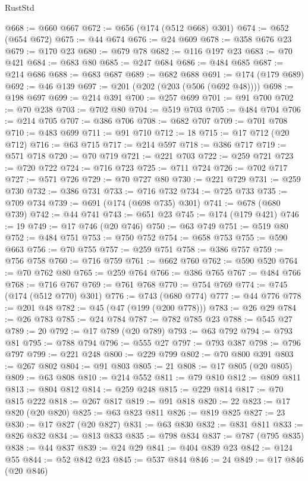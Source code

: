 \begin{lexlean}{RustStd}
\begin{coremodule}
@668 := @660 @667
@672 := @656 (@174 (@512 @668) @301)
@674 := @652 (@654 @672)
@675 := @44 @674
@676 := @24 @609
@678 := @358 @676 @23
@679 := @170 @23
@680 := @679 @78
@682 := @116 @197 @23
@683 := @70 @421
@684 := @683 @80
@685 := @247 @684
@686 := @484 @685
@687 := @214 @686
@688 := @683 @687
@689 := @682 @688
@691 := @174 (@179 @689)
@692 := @46 @139
@697 := @201 (@202 (@203 (@506 (@692 @48))))
@698 := @198 @697
@699 := @214 @391
@700 := @257 @699
@701 := @91 @700
@702 := @70 @238
@703 := @702 @80
@704 := @519 @703
@705 := @484 @704
@706 := @214 @705
@707 := @386 @706
@708 := @682 @707
@709 := @701 @708
@710 := @483 @699
@711 := @91 @710
@712 := 18
@715 := @17 @712 (@20 @712)
@716 := @63 @715
@717 := @214 @597
@718 := @386 @717
@719 := @571 @718
@720 := @70 @719
@721 := @221 @703
@722 := @259 @721
@723 := @720 @722
@724 := @716 @723
@725 := @711 @724
@726 := @702 @717
@727 := @571 @726
@729 := @70 @727 @80
@730 := @221 @729
@731 := @259 @730
@732 := @386 @731
@733 := @716 @732
@734 := @725 @733
@735 := @709 @734
@739 := @691 (@174 (@698 @735) @301)
@741 := @678 (@680 @739)
@742 := @44 @741
@743 := @651 @23
@745 := @174 (@179 @421)
@746 := 19
@749 := @17 @746 (@20 @746)
@750 := @63 @749
@751 := @519 @80
@752 := @484 @751
@753 := @750 @752
@754 := @658 @753
@755 := @590 @663
@756 := @70 @755
@757 := @259 @751
@758 := @386 @757
@759 := @756 @758
@760 := @716 @759
@761 := @662 @760
@762 := @590 @520
@764 := @70 @762 @80
@765 := @259 @764
@766 := @386 @765
@767 := @484 @766
@768 := @716 @767
@769 := @761 @768
@770 := @754 @769
@774 := @745 (@174 (@512 @770) @301)
@776 := @743 (@680 @774)
@777 := @44 @776
@778 := @201 @48
@782 := @45 (@47 (@199 (@200 @778)))
@783 := @26 @29
@784 := @26 @783
@785 := @24 @784
@787 := @782 @785 @23
@788 := @545 @27
@789 := 20
@792 := @17 @789 (@20 @789)
@793 := @63 @792
@794 := @793 @81
@795 := @788 @794
@796 := @555 @27
@797 := @793 @387
@798 := @796 @797
@799 := @221 @248
@800 := @229 @799
@802 := @70 @800 @391
@803 := @267 @802
@804 := @91 @803
@805 := 21
@808 := @17 @805 (@20 @805)
@809 := @63 @808
@810 := @214 @552
@811 := @79 @810
@812 := @809 @811
@813 := @804 @812
@814 := @259 @248
@815 := @229 @814
@817 := @70 @815 @222
@818 := @267 @817
@819 := @91 @818
@820 := 22
@823 := @17 @820 (@20 @820)
@825 := @63 @823 @811
@826 := @819 @825
@827 := 23
@830 := @17 @827 (@20 @827)
@831 := @63 @830
@832 := @831 @811
@833 := @826 @832
@834 := @813 @833
@835 := @798 @834
@837 := @787 (@795 @835)
@838 := @44 @837
@839 := @24 @29
@841 := @404 @839 @23
@842 := @124 @55
@844 := @52 @842 @23
@845 := @537 @844
@846 := 24
@849 := @17 @846 (@20 @846)

\end{coremodule}
\end{lexlean}
